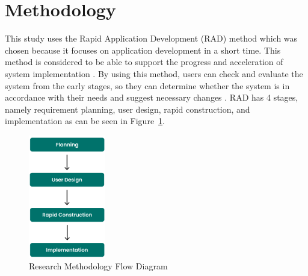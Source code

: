 \documentclass[conference,a4paper]{IEEEtran}
\begin{document}
\section{Methodology}
\label{sect:methodology}

This study uses the Rapid Application Development (RAD) method which was chosen because it focuses on application development in a short time. This method is considered to be able to support the progress and acceleration of system implementation \cite{b18}. By using this method, users can check and evaluate the system from the early stages, so they can determine whether the system is in accordance with their needs and suggest necessary changes \cite{b19}. RAD has 4 stages, namely requirement planning, user design, rapid construction, and implementation as can be seen in Figure~\ref{method}.

\begin{figure}[htb]
  \centering
  \includegraphics[width=0.3\textwidth]{images/method}
  \caption{Research Methodology Flow Diagram}
  \label{method}
\end{figure}
\end{document}
